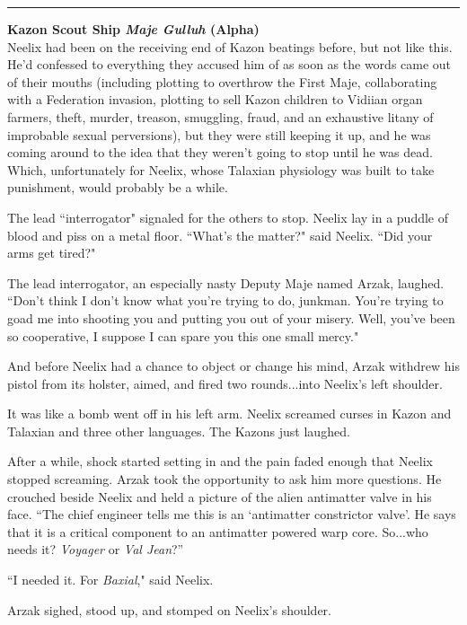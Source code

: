 \documentclass[twoside,letterpaper,12pt]{memoir}
\begin{document}
\begin{center}\rule{3cm}{0.4 pt}\end{center}

\noindent\textbf{Kazon Scout Ship \textit{Maje Gulluh} (Alpha)}\\

Neelix had been on the receiving end of Kazon beatings before, but not like this. He'd confessed to everything they accused him of as soon as the words came out of their mouths (including plotting to overthrow the First Maje, collaborating with a Federation invasion, plotting to sell Kazon children to Vidiian organ farmers, theft, murder, treason, smuggling, fraud, and an exhaustive litany of improbable sexual perversions), but they were still keeping it up, and he was coming around to the idea that they weren't going to stop until he was dead. Which, unfortunately for Neelix, whose Talaxian physiology was built to take punishment, would probably be a while.

The lead ``interrogator" signaled for the others to stop. Neelix lay in a puddle of blood and piss on a metal floor. ``What's the matter?" said Neelix. ``Did your arms get tired?"

The lead interrogator, an especially nasty Deputy Maje named Arzak, laughed. ``Don't think I don't know what you're trying to do, junkman. You're trying to goad me into shooting you and putting you out of your misery. Well, you've been so cooperative, I suppose I can spare you this one small mercy."

And before Neelix had a chance to object or change his mind, Arzak withdrew his pistol from its holster, aimed, and fired two rounds...into Neelix's left shoulder.

It was like a bomb went off in his left arm. Neelix screamed curses in Kazon and Talaxian and three other languages. The Kazons just laughed.

After a while, shock started setting in and the pain faded enough that Neelix stopped screaming. Arzak took the opportunity to ask him more questions. He crouched beside Neelix and held a picture of the alien antimatter valve in his face. “The chief engineer tells me this is an ‘antimatter constrictor valve’. He says that it is a critical component to an antimatter powered warp core. So...who needs it? \textit{Voyager} or \textit{Val Jean}?”

``I needed it. For \textit{Baxial}," said Neelix.

Arzak sighed, stood up, and stomped on Neelix's shoulder.
\end{document}
